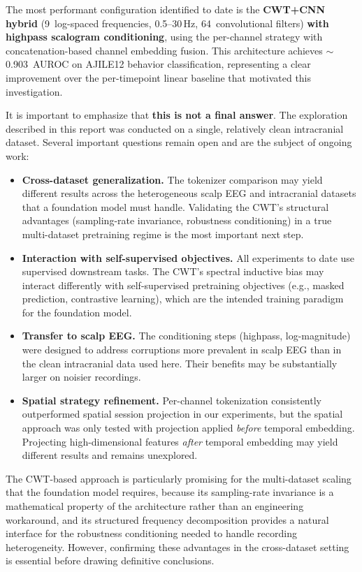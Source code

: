 \documentclass[11pt, a4paper]{article}
\begin{document}
The most performant configuration identified to date is the \textbf{CWT+CNN hybrid} (9~log-spaced frequencies, 0.5--30\,Hz, 64~convolutional filters) \textbf{with highpass scalogram conditioning}, using the per-channel strategy with concatenation-based channel embedding fusion. This architecture achieves $\sim$0.903~AUROC on AJILE12 behavior classification, representing a clear improvement over the per-timepoint linear baseline that motivated this investigation.

It is important to emphasize that \textbf{this is not a final answer}. The exploration described in this report was conducted on a single, relatively clean intracranial dataset. Several important questions remain open and are the subject of ongoing work:

\begin{itemize}[nosep]
    \item \textbf{Cross-dataset generalization.} The tokenizer comparison may yield different results across the heterogeneous scalp EEG and intracranial datasets that a foundation model must handle. Validating the CWT's structural advantages (sampling-rate invariance, robustness conditioning) in a true multi-dataset pretraining regime is the most important next step.
    \item \textbf{Interaction with self-supervised objectives.} All experiments to date use supervised downstream tasks. The CWT's spectral inductive bias may interact differently with self-supervised pretraining objectives (e.g., masked prediction, contrastive learning), which are the intended training paradigm for the foundation model.
    \item \textbf{Transfer to scalp EEG.} The conditioning steps (highpass, log-magnitude) were designed to address corruptions more prevalent in scalp EEG than in the clean intracranial data used here. Their benefits may be substantially larger on noisier recordings.
    \item \textbf{Spatial strategy refinement.} Per-channel tokenization consistently outperformed spatial session projection in our experiments, but the spatial approach was only tested with projection applied \emph{before} temporal embedding. Projecting high-dimensional features \emph{after} temporal embedding may yield different results and remains unexplored.
\end{itemize}

The CWT-based approach is particularly promising for the multi-dataset scaling that the foundation model requires, because its sampling-rate invariance is a mathematical property of the architecture rather than an engineering workaround, and its structured frequency decomposition provides a natural interface for the robustness conditioning needed to handle recording heterogeneity. However, confirming these advantages in the cross-dataset setting is essential before drawing definitive conclusions.
\end{document}
